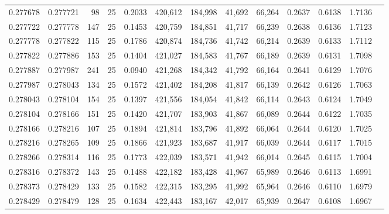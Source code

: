 \begin{tabular}{rrrrrrrrrrrrr}
0.277678 & 0.277721 &    98 &  25 &                                     0.2033 & 420,612 & 184,998 &  41,692 &  66,264 & 0.2637 & 0.6138 & 1.7136 \\
0.277722 & 0.277778 &   147 &  25 &                                     0.1453 & 420,759 & 184,851 &  41,717 &  66,239 & 0.2638 & 0.6136 & 1.7123 \\
0.277778 & 0.277822 &   115 &  25 &                                     0.1786 & 420,874 & 184,736 &  41,742 &  66,214 & 0.2639 & 0.6133 & 1.7112 \\
0.277822 & 0.277886 &   153 &  25 &                                     0.1404 & 421,027 & 184,583 &  41,767 &  66,189 & 0.2639 & 0.6131 & 1.7098 \\
0.277887 & 0.277987 &   241 &  25 &                                     0.0940 & 421,268 & 184,342 &  41,792 &  66,164 & 0.2641 & 0.6129 & 1.7076 \\
0.277987 & 0.278043 &   134 &  25 &                                     0.1572 & 421,402 & 184,208 &  41,817 &  66,139 & 0.2642 & 0.6126 & 1.7063 \\
0.278043 & 0.278104 &   154 &  25 &                                     0.1397 & 421,556 & 184,054 &  41,842 &  66,114 & 0.2643 & 0.6124 & 1.7049 \\
0.278104 & 0.278166 &   151 &  25 &                                     0.1420 & 421,707 & 183,903 &  41,867 &  66,089 & 0.2644 & 0.6122 & 1.7035 \\
0.278166 & 0.278216 &   107 &  25 &                                     0.1894 & 421,814 & 183,796 &  41,892 &  66,064 & 0.2644 & 0.6120 & 1.7025 \\
0.278216 & 0.278265 &   109 &  25 &                                     0.1866 & 421,923 & 183,687 &  41,917 &  66,039 & 0.2644 & 0.6117 & 1.7015 \\
0.278266 & 0.278314 &   116 &  25 &                                     0.1773 & 422,039 & 183,571 &  41,942 &  66,014 & 0.2645 & 0.6115 & 1.7004 \\
0.278316 & 0.278372 &   143 &  25 &                                     0.1488 & 422,182 & 183,428 &  41,967 &  65,989 & 0.2646 & 0.6113 & 1.6991 \\
0.278373 & 0.278429 &   133 &  25 &                                     0.1582 & 422,315 & 183,295 &  41,992 &  65,964 & 0.2646 & 0.6110 & 1.6979 \\
0.278429 & 0.278479 &   128 &  25 &                                     0.1634 & 422,443 & 183,167 &  42,017 &  65,939 & 0.2647 & 0.6108 & 1.6967 \\

\end{tabular}
